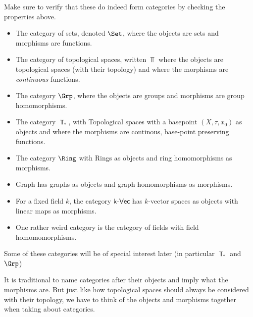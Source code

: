 \begin{ex}[]
  Make sure to verify that these do indeed form categories by checking the properties above.
  \begin{itemize}
    \item The category of sets, denoted $\Set$, where the objects are sets and morphisms are functions.
    \item The category of topological spaces, written $\Top$ where the objects are topological spaces (with their topology) and where the morphisms are \emph{continuous} functions.
    \item The category $\Grp$, where the objects are groups and morphisms are group homomorphisms.
    \item The category $\Top_{\ast}$, with Topological spaces with a basepoint $(X,\tau,x_0)$ as objects and where the morphisms are continous, base-point preserving functions.
    \item The category $\Ring$ with Rings as objects and ring homomorphisms as morphisms.
    \item \textsf{Graph} has graphs as objects and graph homomorphisms as morphisms.
    \item For a fixed field $k$, the category $\textsf{k-Vec}$ has $k$-vector spaces as objects with linear maps as morphisms.
    \item One rather weird category is the category of fields with field homomomorphisms.
  \end{itemize}
  Some of these categories will be of special interest later (in particular $\Top_{\ast}$ and $\Grp$)
\end{ex}

It is traditional to name categories after their objects and imply what the morphisms are.
But just like how topological spaces should always be considered with their topology, we have to think of the objects and morphisms together when taking about categories.


